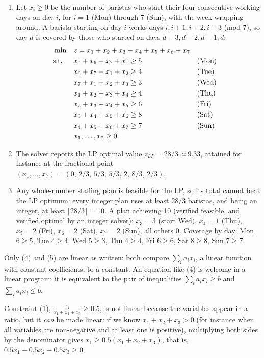 \begin{enumerate}
\item Let $x_i \geq 0$ be the number of baristas who start their four consecutive working days on day $i$, for $i = 1$ (Mon) through $7$ (Sun), with the week wrapping around. A barista starting on day $i$ works days $i, i+1, i+2, i+3$ (mod 7), so day $d$ is covered by those who started on days $d-3, d-2, d-1, d$:
\begin{align*}
\min \quad & z = x_1 + x_2 + x_3 + x_4 + x_5 + x_6 + x_7\\
\text{s.t.}\;\; \quad & x_5 + x_6 + x_7 + x_1 \geq 5 && \text{(Mon)}\\
& x_6 + x_7 + x_1 + x_2 \geq 4 && \text{(Tue)}\\
& x_7 + x_1 + x_2 + x_3 \geq 3 && \text{(Wed)}\\
& x_1 + x_2 + x_3 + x_4 \geq 4 && \text{(Thu)}\\
& x_2 + x_3 + x_4 + x_5 \geq 6 && \text{(Fri)}\\
& x_3 + x_4 + x_5 + x_6 \geq 8 && \text{(Sat)}\\
& x_4 + x_5 + x_6 + x_7 \geq 7 && \text{(Sun)}\\
& x_1, \dots, x_7 \geq 0.
\end{align*}
\item The solver reports the LP optimal value $z_{LP} = 28/3 \approx 9.33$, attained for instance at the fractional point $(x_1,\dots,x_7) = (0,\, 2/3,\, 5/3,\, 5/3,\, 2,\, 8/3,\, 2/3)$.
\item Any whole-number staffing plan is feasible for the LP, so its total cannot beat the LP optimum: every integer plan uses at least $28/3$ baristas, and being an integer, at least $\lceil 28/3 \rceil = 10$. A plan achieving 10 (verified feasible, and verified optimal by an integer solver): $x_3 = 3$ (start Wed), $x_4 = 1$ (Thu), $x_5 = 2$ (Fri), $x_6 = 2$ (Sat), $x_7 = 2$ (Sun), all others 0. Coverage by day: Mon $6 \geq 5$, Tue $4 \geq 4$, Wed $5 \geq 3$, Thu $4 \geq 4$, Fri $6 \geq 6$, Sat $8 \geq 8$, Sun $7 \geq 7$.
\end{enumerate}


Only (4) and (5) are linear as written: both compare $\sum_i a_i x_i$, a linear function with constant coefficients, to a constant. An equation like (4) is welcome in a linear program; it is equivalent to the pair of inequalities $\sum_i a_i x_i \geq b$ and $\sum_i a_i x_i \leq b$.

Constraint (1), $\frac{x_1}{x_1 + x_2 + x_3} \geq 0.5$, is not linear because the variables appear in a ratio, but it \emph{can} be made linear: if we know $x_1 + x_2 + x_3 > 0$ (for instance when all variables are non-negative and at least one is positive), multiplying both sides by the denominator gives $x_1 \geq 0.5(x_1 + x_2 + x_3)$, that is, $0.5x_1 - 0.5x_2 - 0.5x_3 \geq 0$.

